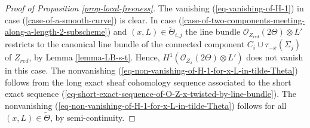 \documentclass[12pt]{amsart}
\numberwithin{equation}{subsection}
\theoremstyle{plain}
\theoremstyle{definition}
\newcommand{\StructureSheaf}[1]{{\mathcal O}_{#1}}
\begin{document}
\begin{proof}[Proof of Proposition \ref{prop-local-freeness}]
The vanishing (\ref{eq-vanishing-of-H-1}) in case (\ref{case-of-a-smooth-curve}) is clear.
In case (\ref{case-of-two-components-meeting-along-a-length-2-subscheme}) and $(x,L)\in \tilde{\Theta}_{i,j}$ 
the line bundle $\StructureSheaf{Z_{red}}(2\Theta)\otimes L'$ restricts to the canonical line bundle of the connected component $C_i\cup\tau_{-x}(\Sigma_j)$ of $Z_{red}$,
by Lemma \ref{lemma-LB-s-t}.
Hence, $H^1(\StructureSheaf{Z_x}(2\Theta)\otimes L')$ does not vanish in this case. The nonvanishing
(\ref{eq-non-vanishing-of-H-1-for-x-L-in-tilde-Theta}) follows from the long exact sheaf cohomology sequence associated to the short exact sequence (\ref{eq-short-exact-sequence-of-O-Z-x-twisted-by-line-bundle}). The nonvanishing (\ref{eq-non-vanishing-of-H-1-for-x-L-in-tilde-Theta}) follows for all $(x,L)\in\tilde{\Theta}$, by semi-continuity.


\end{proof}
\end{document}
